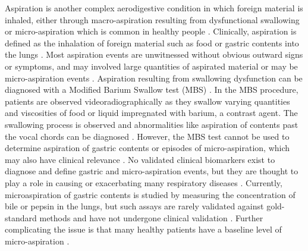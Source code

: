 \documentclass[12pt]{article}
\begin{document}
Aspiration is another complex aerodigestive condition in which foreign material is inhaled, either through macro-aspiration resulting from dysfunctional swallowing or micro-aspiration which is common in healthy people \cite{sweet-gerd_asp-2009, dickson-lung_microbiome-2014}.
Clinically, aspiration is defined as the inhalation of foreign material such as food or 
gastric contents into the lungs \cite{raghavendran-asp_injury-2011}. 
Most aspiration events are unwitnessed without obvious outward signs 
or symptoms, and may involved large quantities of aspirated material 
or may be micro-aspiration events \cite{raghavendran-asp_injury-2011}. 
Aspiration resulting from swallowing dysfunction can be diagnosed with 
a Modified Barium Swallow test (MBS) \cite{martinharris-mbs-2008}. In 
the MBS procedure, patients are observed videoradiographically as they 
swallow varying quantities and viscosities of food or liquid 
impregnated with barium, a contrast agent. The swallowing process is 
observed and abnormalities like aspiration of contents past the vocal 
chords can be diagnosed \cite{martinharris-mbs-2008, martinharris-clinical_mbs-2000}. 
However, the MBS test cannot be used to 
determine aspiration of gastric contents or episodes of micro-aspiration, which may also have clinical relevance 
\cite{raghavendran-asp_injury-2011, lee-pulm_asp-2014}. No validated clinical 
biomarkers exist to diagnose and define gastric and micro-aspiration 
events\cite{lee-pulm_asp-2014}, but they are thought to play a role in 
causing or exacerbating many respiratory diseases 
\cite{houghton-microaspiration-2016, reen-aspirated_bile-2014, almomani-cf_sputum-2016}. Currently, microaspiration of gastric contents 
is studied by measuring the concentration of bile or pepsin in the 
lungs, but such assays are rarely validated against gold-standard 
methods and have not undergone clinical validation 
\cite{houghton-microaspiration-2016, lee-pulm_asp-2014}. Further complicating 
the issue is that many healthy patients have a baseline level of 
micro-aspiration \cite{dickson-lung_microbiome-2014, sweet-gerd_asp-2009}.
\end{document}
